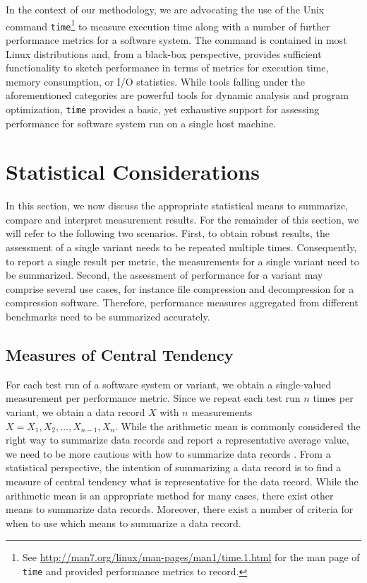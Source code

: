 In the context of our methodology, we are advocating the use of the Unix
command \texttt{time}\footnote{See
\url{http://man7.org/linux/man-pages/man1/time.1.html} for the man page of
\texttt{time} and provided performance metrics to record.} to measure execution
time along with a number of further performance metrics for a software system.
The command is contained in most Linux distributions and, from a black-box
perspective, provides sufficient functionality to sketch performance in terms of
metrics for execution time, memory consumption, or I/O statistics. While tools falling under the aforementioned categories are powerful tools for dynamic analysis and program
optimization, \texttt{time} provides a basic, yet exhaustive support for
assessing performance for software system run on a single host machine. 

\section{Statistical Considerations}\label{sec:statistical_considerations}
In this section, we now discuss the appropriate statistical means to summarize,
compare and interpret measurement results. For the remainder of this section, we
will refer to the following two scenarios. First, to obtain robust results, the
assessment of a single variant needs to be repeated multiple times.
Consequently, to report a single result per metric, the measurements for a
single variant need to be summarized. Second, the assessment of performance for
a variant may comprise several use cases, for instance file
compression and decompression for a compression software. Therefore, performance measures
aggregated from different benchmarks need to be summarized accurately. 

\subsection{Measures of Central Tendency}
For each test run of a software system or variant, we obtain a single-valued
measurement per performance metric. Since we repeat each test run $n$ times
per variant, we obtain a data record $X$ with $n$ measurements $X = X_1, X_2,
\ldots, X_{n-1}, X_n$. While the arithmetic mean is commonly considered the
right way to summarize data records and report a representative average
value, we need to be more cautious with how to summarize data records
\citep{fleming_how_1986,smith_characterizing_1988}. From a statistical
perspective, the intention of summarizing a data record is to find a measure of
central tendency what is representative for the data record.
While the arithmetic mean is an appropriate method for many cases, there exist
other means to summarize data records. Moreover, there exist a number of
criteria for when to use which means to summarize a data record. 

